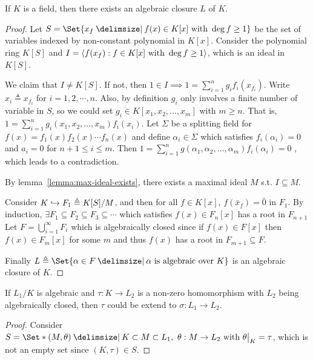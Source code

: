 \begin{theorem}
  If $K$ is a field, then there exists an algebraic closure $L$ of $K$.

  \begin{proof}
    Let $S = \Set{x_f \given f(x) \in K[x] \text{ with } \deg f \geq 1}$ be the
    set of variables indexed by non-constant polynomial in $K[x]$. Consider
    the polynomial ring $K[S]$ and $I = \langle f(x_f) : f \in K[x] \text{ with } \deg f \geq 1 \rangle$,
    which is an ideal in $K[S]$.

    We claim that $I \neq K[S]$. If not, then $1 \in I \implies 1 = \sum_{i = 1}^n g_i f_i(x_{f_i})$.
    Write $x_i \triangleq x_{f_i}$ for $i = 1, 2, \cdots, n$. Also, by definition
    $g_i$ only involves a finite number of variable in $S$, so we could set
    $g_i \in K[x_1, x_2, \dots, x_m]$ with $m \geq n$. That is,
    $1 = \sum_{i = 1}^n g_i(x_1, x_2, \dots, x_m) f_i(x_i)$. Let $\Sigma$ be a
    splitting field for $f(x) = f_1(x) f_2(x) \dotsm f_n(x)$ and define $\alpha_i \in \Sigma$
    which satisfies $f_i(\alpha_i) = 0$ and $a_i = 0$ for $n+1 \leq i \leq m$. Then
    $1 = \sum_{i = 1}^n g(\alpha_1, \alpha_2, \dots, \alpha_m) f_i(\alpha_i) = 0$
    , which leads to a contradiction.

    By lemma~\ref{lemma:max-ideal-exists}, there exists a maximal ideal $M$ s.t. $I \subseteq M$.

    Consider $K \hookrightarrow F_1 \triangleq K[S] / M$, and then for all $f \in K[x]$,
    $f(\bar{x}_f) = \bar{0}$ in $F_1$.  By induction, $\exists F_1 \subseteq F_2 \subseteq F_3 \subseteq \cdots$
    which satisfies $f(x) \in F_n[x]$ has a root in $F_{n+1}$
    Let $F = \bigcup_{i = 1}^\infty F_i$ which is algebraically closed since if
    $f(x) \in F[x]$ then $f(x) \in F_m[x]$ for some $m$ and thus $f(x)$ has a root in $F_{m+1} \subseteq F$.

    Finally $L \triangleq \Set{ \alpha \in F \given \alpha \text{ is algebraic over } K }$
    is an algebraic closure of $K$.
  \end{proof}

  \begin{lemma} \label{lemma:homo-extend-to-alg-closed-extension}
    If $L_1 / K$ is algebraic and $\tau: K \to L_2$ is a non-zero homomorphism
    with $L_2$ being algebraically closed, then $\tau$ could be extend to $\sigma: L_1 \to L_2$.

    \begin{proof}
      Consider $S = \Set*{ (M, \theta) \given K \subset M \subset L_1,\ \theta: M \to L_2
      \text{ with } \theta\big|_K = \tau }$, which is not an empty set since $(K, \tau) \in S$.


\end{proof}
\end{lemma}
\end{theorem}
